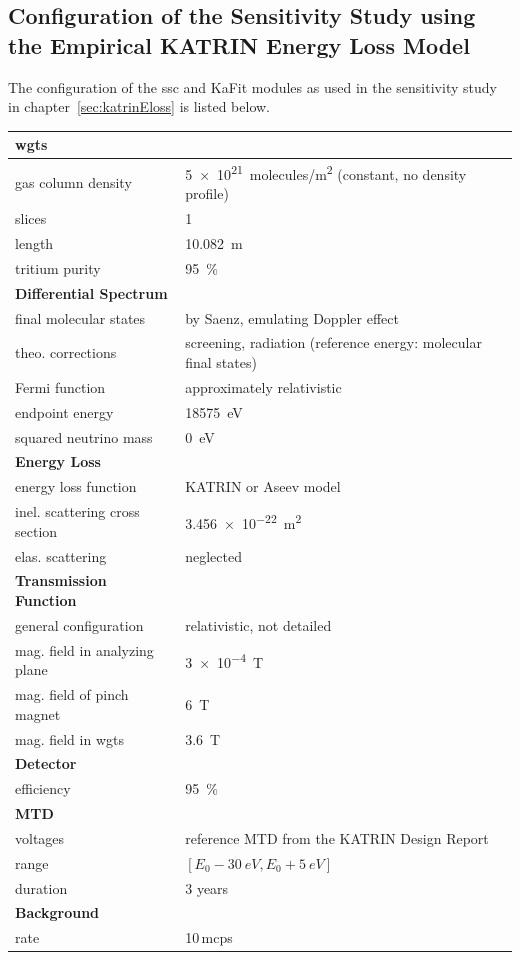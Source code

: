 \begin{samepage}
\section{Configuration of the Sensitivity Study using the Empirical KATRIN Energy Loss Model}
\label{sec:appendixKatrinElossSSCConfig}
The configuration of the \gls{ssc} and KaFit modules as used in the sensitivity study in chapter~\ref{sec:katrinEloss} is listed below.

\newcommand{\myModelConfigTableStrut}{\rule{0pt}{4ex}}
\begin{tabular}{ll}
	\toprule
	\textbf{\gls{wgts}} & \\
	\midrule
	gas column density & \SI{5e21}{molecules/m^2} (constant, no density profile) \\
	slices & 1 \\
	length & \SI{10.082}{m} \\
	tritium purity & \SI{95}{\percent} \\
	\myModelConfigTableStrut
	\textbf{Differential Spectrum} & \\
	\midrule
	final molecular states & by Saenz, emulating Doppler effect \\
	theo. corrections & screening, radiation (reference energy: molecular final states) \\
	Fermi function & approximately relativistic \\
	endpoint energy & \SI{18575}{eV} \\
	squared neutrino mass & \SI{0}{eV} \\
	\myModelConfigTableStrut
	\textbf{Energy Loss} & \\
	\midrule
	energy loss function & KATRIN or Aseev model \\
	inel. scattering cross section & \SI{3.456e-22}{m^2} \\
	elas. scattering & neglected \\
	\myModelConfigTableStrut
	\textbf{Transmission Function} & \\
	\midrule
	general configuration & relativistic, not detailed \\
	mag. field in analyzing plane & \SI{3e-4}{T} \\
	mag. field of pinch magnet & \SI{6}{T} \\
	mag. field in \gls{wgts} & \SI{3.6}{T} \\
	\myModelConfigTableStrut
	\textbf{Detector} & \\
	\midrule
	efficiency & \SI{95}{\percent} \\
	\myModelConfigTableStrut
	\textbf{MTD} & \\
	\midrule
	voltages & reference MTD from the KATRIN Design Report \\
	range & $[E_0-\SI{30}{eV},E_0+\SI{5}{eV}]$ \\
	duration & 3 years \\
	\myModelConfigTableStrut
	\textbf{Background} & \\
	\midrule
	rate & 10\,mcps \\
	\bottomrule
\end{tabular}
\end{samepage}